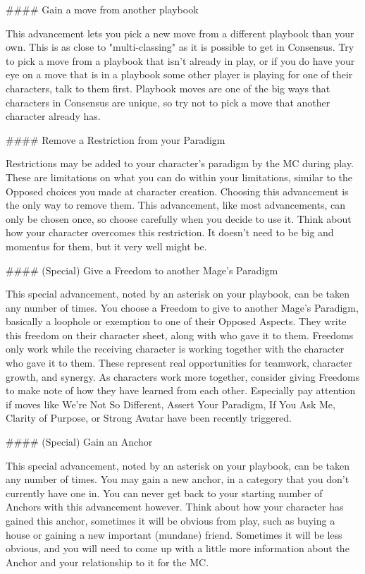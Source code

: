 \documentclass[
  oneside,
  statementpaper,
  9pt]{memoir}
\begin{document}
\begin{Player}
#### Gain a move from another playbook

This advancement lets you pick a new move from a different playbook than your own. This is as close to "multi-classing" as it is possible to get in Consensus. Try to pick a move from a playbook that isn’t already in play, or if you do have your eye on a move that is in a playbook some other player is playing for one of their characters, talk to them first. Playbook moves are one of the big ways that characters in Consensus are unique, so try not to pick a move that another character already has.

#### Remove a Restriction from your Paradigm

Restrictions may be added to your character’s paradigm by the MC during play. These are limitations on what you can do within your limitations, similar to the Opposed choices you made at character creation. Choosing this advancement is the only way to remove them. This advancement, like most advancements, can only be chosen once, so choose carefully when you decide to use it. Think about how your character overcomes this restriction. It doesn’t need to be big and momentus for them, but it very well might be. 

#### (Special) Give a Freedom to another Mage’s Paradigm

This special advancement, noted by an asterisk on your playbook, can be taken any number of times. You choose a Freedom to give to another Mage’s Paradigm, basically a loophole or exemption to one of their Opposed Aspects. They write this freedom on their character sheet, along with who gave it to them. Freedoms only work while the receiving character is working together with the character who gave it to them. These represent real opportunities for teamwork, character growth, and synergy. As characters work more together, consider giving Freedoms to make note of how they have learned from each other. Especially pay attention if  moves like We’re Not So Different, Assert Your Paradigm, If You Ask Me, Clarity of Purpose, or Strong Avatar have been recently triggered.

#### (Special) Gain an Anchor

This special advancement, noted by an asterisk on your playbook, can be taken any number of times. You may gain a new anchor, in a category that you don’t currently have one in. You can never get back to your starting number of Anchors with this advancement however. Think about how your character has gained this anchor, sometimes it will be obvious from play, such as buying a house or gaining a new important (mundane) friend. Sometimes it will be less obvious, and you will need to come up with a little more information about the Anchor and your relationship to it for the MC. 


\end{Player}
\end{document}
